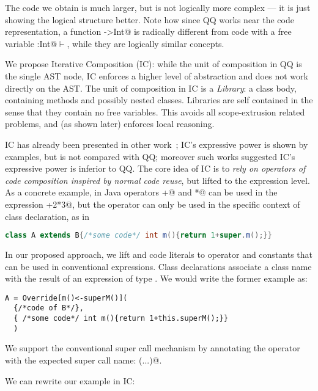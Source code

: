 The code we obtain is much larger, but is not logically more complex --- it is just showing the logical structure better.
Note how since QQ works near the code representation,
a function \Q@Int->Int@ is radically different from
code with a free variable \Q@x:Int@$\vdash$\Q@Int@, while they are 
logically similar concepts.


We propose Iterative Composition (IC):
while the unit of composition in QQ is the single AST node, 
IC enforces a higher level of abstraction and does not work directly on the AST.
The unit of composition in IC is a \emph{Library}:
a class body, containing methods and possibly nested classes.
Libraries are self contained in the sense that they contain no free variables.
This avoids all scope-extrusion related problems, and (as shown later) enforces local reasoning.

IC has already been presented in other work~\cite{servetto2014meta};
 IC's expressive power is shown by examples,
but is not compared with QQ; moreover such works suggested IC's expressive power is inferior to QQ.
The core idea of IC is to  \emph{rely on  operators of code composition inspired by normal
code reuse}, but lifted to the expression level.
As a concrete example, in Java operators \Q@+@ and \Q@*@ can be used in the expression +2*3@,
but the operator \Q@extends@ can only be used in the specific context of class declaration, as in

\begin{lstlisting}[language=Java]
class A extends B{/*some code*/ int m(){return 1+super.m();}}
\end{lstlisting}

In our proposed approach, we lift \Q@extends@ and code literals to operator and constants
that can be used in conventional expressions.
Class declarations associate a class name with the result of an expression of type \Q@Library@. 
 We would write the former example as:

\begin{lstlisting}
A = Override[m()<-superM()]( 
  {/*code of B*/},
  { /*some code*/ int m(){return 1+this.superM();}}
  )
\end{lstlisting}

\noindent We support the conventional super call mechanism by annotating the operator with
the expected super call name: \Q@Override[m()<-superM()](...)@.


\noindent
We can rewrite our \Q@pow@ example 
in IC:

